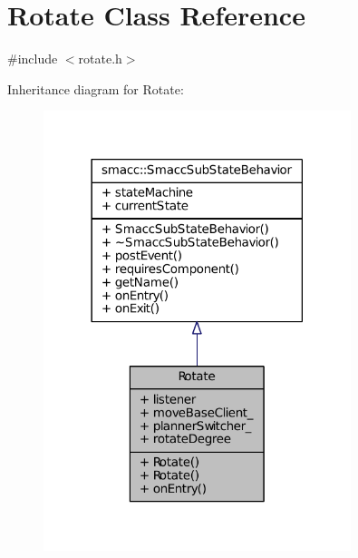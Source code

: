\hypertarget{classRotate}{}\section{Rotate Class Reference}
\label{classRotate}


{\ttfamily \#include $<$rotate.\+h$>$}



Inheritance diagram for Rotate\+:
\nopagebreak
\begin{figure}[H]
\begin{center}
\leavevmode
\includegraphics[width=254pt]{classRotate__inherit__graph}
\end{center}
\end{figure}


